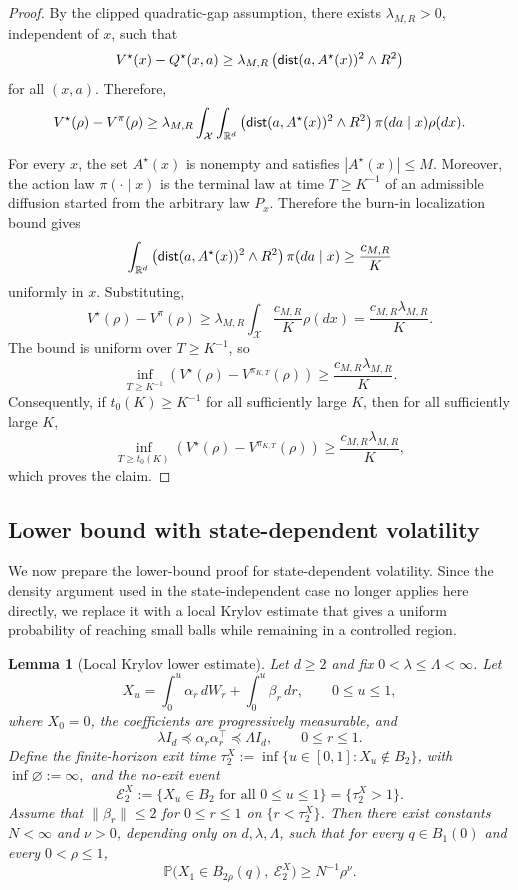 \documentclass{article}
\newtheorem{lem}[thm]{Lemma}
\newcommand{\1}{\mathbbm{1}}
\newcommand{\dist}{{\sf dist}}
\numberwithin{equation}{section}
\begin{document}
\begin{proof}
By the clipped quadratic-gap assumption, there exists
\(\lambda_{M,R}>0\), independent of \(x\), such that
\[
    V^\star(x)-Q^\star(x,a)
    \geq
    \lambda_{M,R}
    \left(
        \dist(a,A^\star(x))^2\wedge R^2
    \right)
\]
for all \((x,a)\). Therefore,
\[
V^\star(\rho)-V^\pi(\rho)
\geq
\lambda_{M,R}
\int_{\mathcal X}
\int_{\mathbb R^d}
\left(
    \dist(a,A^\star(x))^2\wedge R^2
\right)
\pi(da\mid x)\rho(dx).
\]

For every \(x\), the set \(A^\star(x)\) is nonempty and satisfies
\(|A^\star(x)|\leq M\). Moreover, the action law \(\pi(\cdot\mid x)\) is
the terminal law at time \(T\geq K^{-1}\) of an admissible diffusion started
from the arbitrary law \(P_x\). Therefore the burn-in localization bound gives
\[
\int_{\mathbb R^d}
\left(
    \dist(a,A^\star(x))^2\wedge R^2
\right)
\pi(da\mid x)
\geq
\frac{c_{M,R}}{K}
\]
uniformly in \(x\). Substituting,
\[
V^\star(\rho)-V^\pi(\rho)
\geq
\lambda_{M,R}
\int_{\mathcal X}
\frac{c_{M,R}}{K}\rho(dx)
=
\frac{c_{M,R}\lambda_{M,R}}{K}.
\]
The bound is uniform over \(T\geq K^{-1}\), so
\[
    \inf_{T\geq K^{-1}}
    \left(
        V^\star(\rho)-V^{\pi_{K,T}}(\rho)
    \right)
    \geq
    \frac{c_{M,R}\lambda_{M,R}}{K}.
\]
Consequently, if \(t_0(K)\geq K^{-1}\) for all sufficiently large \(K\), then
for all sufficiently large \(K\),
\[
    \inf_{T\geq t_0(K)}
    \left(
        V^\star(\rho)-V^{\pi_{K,T}}(\rho)
    \right)
    \geq
    \frac{c_{M,R}\lambda_{M,R}}{K},
\]
which proves the claim.
\end{proof}

\subsection{Lower bound with state-dependent volatility}

We now prepare the lower-bound proof for state-dependent volatility. Since the density argument used in the state-independent case no longer applies here directly, we replace it with a local Krylov estimate that gives a uniform probability of reaching small balls while remaining in a controlled region.


\begin{lem}[Local Krylov lower estimate]\label{lem:krylov-lower-local}
Let $d\ge 2$ and fix $0<\lambda\le \Lambda<\infty$. Let
\[
X_u=\int_0^u \alpha_r\,dW_r+\int_0^u \beta_r\,dr,
\qquad 0\le u\le 1,
\]
where $X_0=0$, the coefficients are progressively measurable, and
\[
\lambda I_d \preceq \alpha_r\alpha_r^\top \preceq \Lambda I_d,
\qquad 0\le r\le 1.
\]
Define the finite-horizon exit time
$
\tau_2^X:=\inf\{u\in[0,1]:X_u\notin B_2\}$, with $\inf\varnothing:=\infty,
$
and the no-exit event
\[
\mathcal E_2^X:=\{X_u\in B_2\text{ for all }0\le u\le 1\}
=\{\tau_2^X>1\}.
\]
Assume that
$
\|\beta_r\|\le 2$ for $0\le r\le1$ on $\{r<\tau_2^X\}$.
Then there exist constants $N<\infty$ and $\nu>0$, depending only on
$d,\lambda,\Lambda$, such that for every $q\in B_{1}(0)$ and every
$0<\rho\le1$,
\[
\mathbb P\bigl(X_1\in B_{2\rho}(q),\ \mathcal E_2^X\bigr)
\ge N^{-1}\rho^\nu .
\]
\end{lem}
\end{document}
